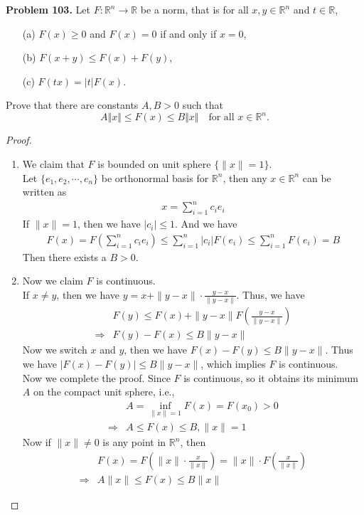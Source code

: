 \documentclass[12pt,leqno]{amsart}
\theoremstyle{definition}
\numberwithin{equation}{subsection}
\begin{document}
\noindent
{\bf Problem 103.}
Let $F:\mathbb{R}^n\to\mathbb{R}$ be a norm, that is for all $x,y\in\mathbb{R}^n$ and $t\in\mathbb{R}$,
\begin{itemize}
\item[(a)] $F(x)\geq 0$ and $F(x)=0$ if and only if $x=0$,
\item[(b)] $F(x+y)\leq F(x)+F(y)$,
\item[(c)] $F(tx)=|t|F(x)$.
\end{itemize}
Prove that there are constants $A,B>0$ such that
$$
A\Vert x\Vert\leq F(x)\leq B\Vert x\Vert
\quad
\text{for all $x\in\mathbb{R}^n$.}
$$
\begin{proof}
~\begin{enumerate}
    \item We claim that $F$ is bounded on unit sphere $\{\|x\| = 1\}$. \\
    Let $\{e_1,e_2,\cdots,e_n\}$ be orthonormal basis for $\mathbb{R}^n$, then any $x\in\mathbb{R}^n$ can be written as
    \begin{align*}
        x = \sum^n_{i=1} c_ie_i
    \end{align*}
    If $\|x\| = 1$, then we have $|c_i| \leq 1$. And we have 
    \begin{align*}
        F(x) = F\left(\sum^n_{i=1} c_ie_i\right) \leq \sum^n_{i=1} |c_i| F(e_i) \leq \sum^n_{i=1} F(e_i) = B
    \end{align*}
    Then there exists a $B > 0$.
    \item Now we claim $F$ is continuous. \\
    If $x \neq y$, then we have $y = x + \|y-x\|\cdot \frac{y-x}{\|y-x\|}$. Thus, we have
    \begin{align*}
        & F(y) \leq F(x) + \|y-x\| F \left(\frac{y-x}{\|y-x\|}\right) \\
        \Rightarrow & F(y) - F(x) \leq B\|y-x\|
    \end{align*}
    Now we switch $x$ and $y$, then we have $F(x) - F(y) \leq B\|y-x\|$. Thus we have $|F(x) - F(y)|\leq B \|y-x\|$, which implies $F$ is continuous. \\

    Now we complete the proof. Since $F$ is continuous, so it obtains its minimum $A$ on the compact unit sphere, i.e.,
    \begin{align*}
        & A = \inf_{\|x\| = 1}F(x) = F(x_0) > 0 \\
        \Rightarrow & A\leq F(x) \leq B, \|x\| = 1
    \end{align*}
    Now if $\|x\|\neq 0$ is any point in $\mathbb{R}^n$, then 
    \begin{align*}
        & F(x) = F\left(\|x\|\cdot\frac{x}{\|x\|}\right) = \|x\|\cdot F\left(\frac{x}{\|x\|}\right) \\
        \Rightarrow & A\|x\|\leq F(x)\leq B\|x\|
    \end{align*}
\end{enumerate}
\end{proof}
\end{document}
